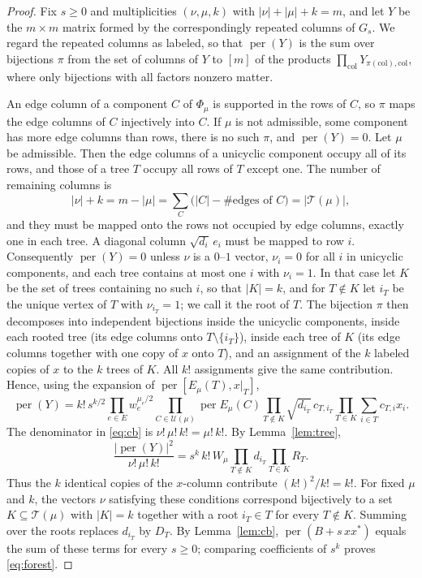 \documentclass[11pt]{amsart}
\theoremstyle{remark}
\numberwithin{equation}{section}
\newcommand{\per}{\operatorname{per}}
\newcommand{\cT}{\mathcal{T}}
\newcommand{\cU}{\mathcal{U}}
\begin{document}
\begin{proof}
Fix $s\ge0$ and multiplicities $(\nu,\mu,k)$ with $|\nu|+|\mu|+k=m$, and let $Y$ be the $m\times m$ matrix formed by the correspondingly repeated columns of $G_s$. We regard the repeated columns as labeled, so that $\per(Y)$ is the sum over bijections $\pi$ from the set of columns of $Y$ to $[m]$ of the products $\prod_{\text{col}}Y_{\pi(\text{col}),\text{col}}$, where only bijections with all factors nonzero matter.

An edge column of a component $C$ of $\Phi_\mu$ is supported in the rows of $C$, so $\pi$ maps the edge columns of $C$ injectively into $C$. If $\mu$ is not admissible, some component has more edge columns than rows, there is no such $\pi$, and $\per(Y)=0$. Let $\mu$ be admissible. Then the edge columns of a unicyclic component occupy all of its rows, and those of a tree $T$ occupy all rows of $T$ except one. The number of remaining columns is
\[
|\nu|+k=m-|\mu|=\sum_C\bigl(|C|-\#\text{edges of }C\bigr)=|\cT(\mu)|,
\]
and they must be mapped onto the rows not occupied by edge columns, exactly one in each tree. A diagonal column $\sqrt{d_i}\,e_i$ must be mapped to row $i$. Consequently $\per(Y)=0$ unless $\nu$ is a $0$--$1$ vector, $\nu_i=0$ for all $i$ in unicyclic components, and each tree contains at most one $i$ with $\nu_i=1$. In that case let $K$ be the set of trees containing no such $i$, so that $|K|=k$, and for $T\notin K$ let $i_T$ be the unique vertex of $T$ with $\nu_{i_T}=1$; we call it the root of $T$. The bijection $\pi$ then decomposes into independent bijections inside the unicyclic components, inside each rooted tree (its edge columns onto $T\setminus\{i_T\}$), inside each tree of $K$ (its edge columns together with one copy of $x$ onto $T$), and an assignment of the $k$ labeled copies of $x$ to the $k$ trees of $K$. All $k!$ assignments give the same contribution. Hence, using the expansion of $\per[E_\mu(T),x|_T]$,
\[
\per(Y)=k!\,s^{k/2}\prod_{e\in E}w_e^{\mu_e/2}\prod_{C\in\cU(\mu)}\per E_\mu(C)\prod_{T\notin K}\sqrt{d_{i_T}}\,c_{T,i_T}\prod_{T\in K}\sum_{i\in T}c_{T,i}x_i .
\]
The denominator in \eqref{eq:cb} is $\nu!\,\mu!\,k!=\mu!\,k!$. By Lemma~\ref{lem:tree},
\[
\frac{|\per(Y)|^2}{\nu!\,\mu!\,k!}=s^k\,k!\,W_\mu\prod_{T\notin K}d_{i_T}\prod_{T\in K}R_T .
\]
Thus the $k$ identical copies of the $x$-column contribute $(k!)^2/k!=k!$. For fixed $\mu$ and $k$, the vectors $\nu$ satisfying these conditions correspond bijectively to a set $K\subseteq\cT(\mu)$ with $|K|=k$ together with a root $i_T\in T$ for every $T\notin K$. Summing over the roots replaces $d_{i_T}$ by $D_T$. By Lemma~\ref{lem:cb}, $\per(B+s\,xx^*)$ equals the sum of these terms for every $s\ge0$; comparing coefficients of $s^k$ proves \eqref{eq:forest}.
\end{proof}
\end{document}
